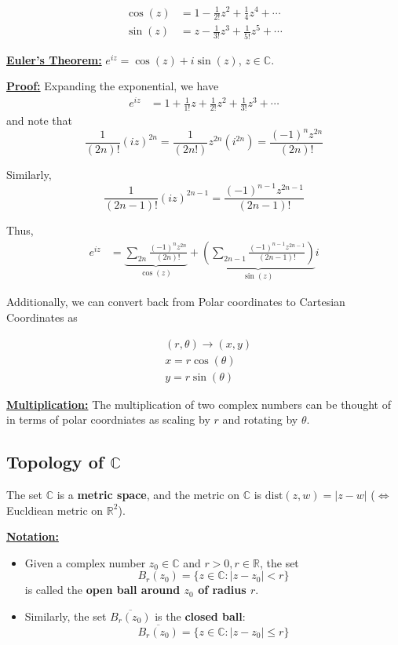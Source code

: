 \documentclass{article}
\newcommand{\R}{\mathbb{R}}
\newcommand{\C}{\mathbb{C}}
\begin{document}
\begin{align*}
  \cos(z) &= 1 - \frac{1}{2!}z^2 + \frac{1}{4}z^4 + \cdots\\
  \sin(z) &= z - \frac{1}{3!}z^3 + \frac{1}{5!}z^5 + \cdots
\end{align*}

\vskip 0.5cm
\begin{mathdefinitionbox}{}
  \underline{\textbf{Euler's Theorem:}} $e^{iz} = \cos(z) + i\sin(z)$, $z \in \C$.

\vskip 0.5cm
\underline{\textbf{Proof:}} 
Expanding the exponential, we have
\begin{align*}
  e^{iz} &= 1 + \frac{1}{1!} z + \frac{1}{2!} z^2 + \frac{1}{3!} z^3 + \cdots 
\end{align*}
and note that 
\[ \frac{1}{(2n)!} (iz)^{2n} = \frac{1}{(2n!)} z^{2n} (i^{2n}) = \frac{(-1)^n z^{2n}}{(2n)!} \]

\vskip 0.5cm
Similarly,
\[ \frac{1}{(2n-1)!} (iz)^{2n-1} = \frac{(-1)^{n-1} z^{2n-1}}{(2n-1)!} \]

\vskip 0.5cm
Thus,
\begin{align*}
  e^{iz} &= \underbrace{\sum_{2n} \frac{(-1)^n z^{2n}}{(2n)!}}_{\cos(z)} + \underbrace{\left( \sum_{2n-1} \frac{(-1)^{n-1} z^{2n-1}}{(2n-1)!} \right)}_{\sin(z)} i
\end{align*}
\end{mathdefinitionbox}

\vskip 0.5cm
Additionally, we can convert back from Polar coordinates to Cartesian Coordinates as 

\begin{align*}
  &(r, \theta) \rightarrow (x, y) \\ 
  &x =r\cos(\theta) \\ 
  &y =r\sin(\theta)  
\end{align*}

\vskip 0.5cm
\underline{\textbf{Multiplication:}}
The multiplication of two complex numbers can be thought of in terms of polar coordniates as scaling by $r$ and rotating by $\theta$.

\vskip 1cm
\subsection*{Topology of $\C$}
The set $\C$ is a \textbf{metric space}, and the metric on $\C$ is $\text{dist}(z, w) = |z - w|$ ($\iff$ Eucldiean metric on $\R^2$).

\vskip 0.5cm
\underline{\textbf{Notation:}}
\begin{itemize}
  \item Given a complex number $z_0 \in \C$ and $r > 0, r \in \R$, the set
  \[ B_{r} (z_0) = \{ z \in \C : |z - z_0| < r \} \]
  is called the \textbf{open ball around $z_0$ of radius $r$}. 

  \vskip 0.5cm
  \item Similarly, the set $\overline{B_r (z_0)}$ is the \textbf{closed ball}:
  \[ \overline{B_r (z_0)} = \{ z \in \C : |z - z_0| \leq r \} \]
\end{itemize}
\end{document}
